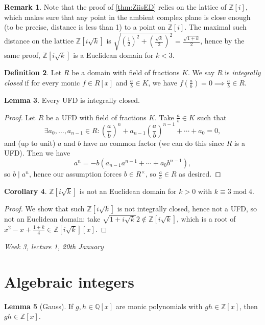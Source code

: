 \documentclass{article}
\newcommand{\Z}{\mathbb{Z}}
\newcommand{\Q}{\mathbb{Q}}
\newcommand{\Mod}{\operatorname{mod}}
\theoremstyle{definition}
\newtheorem{defn}{Definition}[subsection]
\newtheorem{lemma}[defn]{Lemma}
\newtheorem{coro}[defn]{Corollary}
\newtheorem{remark}[defn]{Remark}
\begin{document}
\begin{remark}
Note that the proof of \ref{thm:ZiisED} relies on the lattice of $\Z[i]$, which makes sure that any point in the ambient complex plane is close enough (to be precise, distance is less than 1) to a point on $\Z[i]$. The maximal such distance on the lattice $\Z\left[i\sqrt k\right]$ is $\sqrt{\left(\frac12\right)^2+\left(\frac{\sqrt k}{2}\right)^2}=\frac{\sqrt{1+k}}{2}$, hence by the same proof, $\Z\left[i\sqrt k\right]$ is a Euclidean domain for $k<3$.
\end{remark}

\begin{defn}
Let $R$ be a domain with field of fractions $K$. We say $R$ is \textit{integrally closed} if for every monic $f\in R[x]$ and $\frac{a}{b}\in K$, we have $f\left(\frac{a}{b}\right)=0\implies \frac{a}{b}\in R$.
\end{defn}

\begin{lemma}
\label{lemma:UFDisintclosed}
Every UFD is integrally closed.
\end{lemma}
\begin{proof}
Let $R$ be a UFD with field of fractions $K$. Take $\frac{a}{b}\in K$ such that
\[
\exists a_0,\ldots,a_{n-1}\in R:\left(\frac{a}{b}\right)^n+a_{n-1}\left(\frac{a}{b}\right)^{n-1}+\cdots+a_0=0,
\]
and (up to unit) $a$ and $b$ have no common factor (we can do this since $R$ is a UFD). Then we have
\[
a^n=-b(a_{n-1}a^{n-1}+\cdots+a_0b^{n-1}),
\]
so $b\mid a^n$, hence our assumption forces $b\in R^\times$, so $\frac{a}{b}\in R$ as desired.
\end{proof}

\begin{coro}
$\Z\left[i\sqrt k\right]$ is not an Euclidean domain for $k>0$ with $k\equiv 3\Mod 4$.
\end{coro}
\begin{proof}
We show that such $\Z\left[i\sqrt k\right]$ is not integrally closed, hence not a UFD, so not an Euclidean domain: take $\sqrt{1+i\sqrt k}{2}\notin\Z\left[i\sqrt k\right]$, which is a root of $x^2-x+\frac{1+k}{4}\in\Z\left[i\sqrt k\right][x]$.
\end{proof}

\begin{flushright}
\textit{Week 3, lecture 1, 20th January}
\end{flushright}

\section{Algebraic integers}
\begin{lemma}[Gauss]
\label{lemma:Gauss}
If $g,h\in\Q[x]$ are monic polynomials with $gh\in\Z[x]$, then $gh\in\Z[x]$.
\end{lemma}
\end{document}
